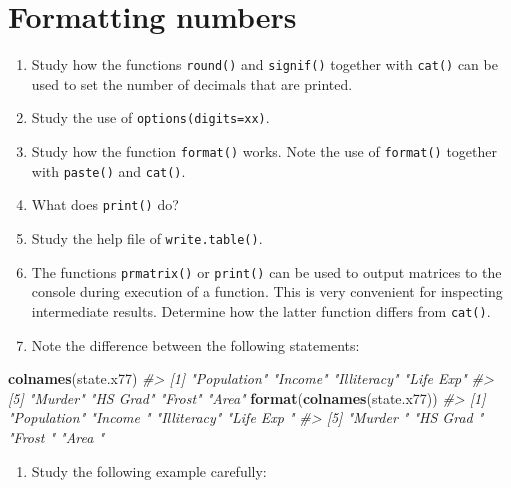 \documentclass[
]{book}
\newenvironment{Shaded}{\begin{snugshade}}{\end{snugshade}}
\newcommand{\CommentTok}[1]{\textcolor[rgb]{0.56,0.35,0.01}{\textit{#1}}}
\newcommand{\FunctionTok}[1]{\textcolor[rgb]{0.13,0.29,0.53}{\textbf{#1}}}
\newcommand{\NormalTok}[1]{#1}
\providecommand{\tightlist}{%
  \setlength{\itemsep}{0pt}\setlength{\parskip}{0pt}}
\begin{document}
\section{Formatting numbers}\label{formatting-numbers}

\begin{enumerate}
\def\labelenumi{(\alph{enumi})}
\item
  Study how the functions \texttt{round()} and \texttt{signif()} together with \texttt{cat()} can be used to set the number of decimals that are printed.
\item
  Study the use of \texttt{options(digits=xx)}.
\item
  Study how the function \texttt{format()} works. Note the use of \texttt{format()} together with \texttt{paste()} and \texttt{cat()}.
\item
  What does \texttt{print()} do?
\item
  Study the help file of \texttt{write.table()}.
\item
  The functions \texttt{prmatrix()} or \texttt{print()} can be used to output matrices to the console during execution of a function. This is very convenient for inspecting intermediate results. Determine how the latter function differs from \texttt{cat()}.
\item
  Note the difference between the following statements:
\end{enumerate}

\begin{Shaded}
\begin{Highlighting}[]
\FunctionTok{colnames}\NormalTok{(state.x77)}
\CommentTok{\#\textgreater{} [1] "Population" "Income"     "Illiteracy" "Life Exp"  }
\CommentTok{\#\textgreater{} [5] "Murder"     "HS Grad"    "Frost"      "Area"}
\FunctionTok{format}\NormalTok{(}\FunctionTok{colnames}\NormalTok{(state.x77))}
\CommentTok{\#\textgreater{} [1] "Population" "Income    " "Illiteracy" "Life Exp  "}
\CommentTok{\#\textgreater{} [5] "Murder    " "HS Grad   " "Frost     " "Area      "}
\end{Highlighting}
\end{Shaded}

\begin{enumerate}
\def\labelenumi{(\alph{enumi})}
\setcounter{enumi}{7}
\tightlist
\item
  Study the following example carefully:
\end{enumerate}
\end{document}
